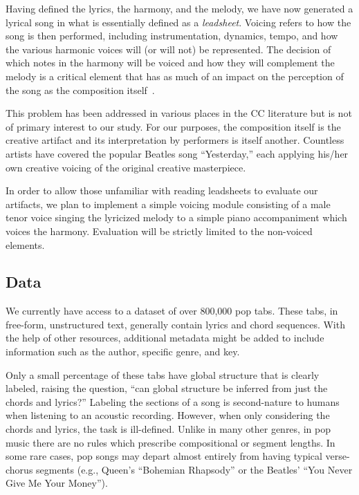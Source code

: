 \documentclass[11pt,phd]{byuprop}
\begin{document}
Having defined the lyrics, the harmony, and the melody, we have now generated a lyrical song in what is essentially defined as a \emph{leadsheet}. Voicing refers to how the song is then performed, including instrumentation, dynamics, tempo, and how the various harmonic voices will (or will not) be represented. The decision of which notes in the harmony will be voiced and how they will complement the melody is a critical element that has as much of an impact on the perception of the song as the composition itself~\cite{papadopoulos1999ai}.

This problem has been addressed in various places in the CC literature but is not of primary interest to our study. For our purposes, the composition itself is the creative artifact and its interpretation by performers is itself another. Countless artists have covered the popular Beatles song ``Yesterday,'' each applying his/her own creative voicing of the original creative masterpiece.

In order to allow those unfamiliar with reading leadsheets to evaluate our artifacts, we plan to implement a simple voicing module consisting of a male tenor voice singing the lyricized melody to a simple piano accompaniment which voices the harmony. Evaluation will be strictly limited to the non-voiced elements.

\subsection{Data}

We currently have access to a dataset of over 800,000 pop tabs. These tabs, in free-form, unstructured text, generally contain lyrics and chord sequences. With the help of other resources, additional metadata might be added to include information such as the author, specific genre, and key.

Only a small percentage of these tabs have global structure that is clearly labeled, raising the question, ``can global structure be inferred from just the chords and lyrics?'' Labeling the sections of a song is second-nature to humans when listening to an acoustic recording. However, when only considering the chords and lyrics, the task is ill-defined. Unlike in many other genres, in pop music there are no rules which prescribe compositional or segment lengths. In some rare cases, pop songs may depart almost entirely from having typical verse-chorus segments (e.g., Queen's ``Bohemian Rhapsody'' or the Beatles' ``You Never Give Me Your Money'').
\end{document}
